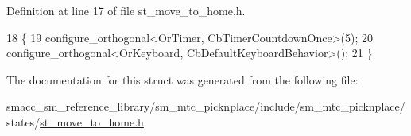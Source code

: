 Definition at line 17 of file st\+\_\+move\+\_\+to\+\_\+home.\+h.


\begin{DoxyCode}
18     \{
19         configure\_orthogonal<OrTimer,  CbTimerCountdownOnce>(5);    
20         configure\_orthogonal<OrKeyboard, CbDefaultKeyboardBehavior>();
21     \}
\end{DoxyCode}


The documentation for this struct was generated from the following file\+:\begin{DoxyCompactItemize}
\item 
smacc\+\_\+sm\+\_\+reference\+\_\+library/sm\+\_\+mtc\+\_\+picknplace/include/sm\+\_\+mtc\+\_\+picknplace/states/\hyperlink{st__move__to__home_8h}{st\+\_\+move\+\_\+to\+\_\+home.\+h}\end{DoxyCompactItemize}
